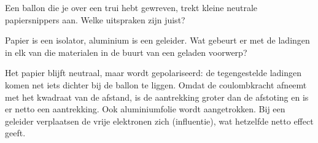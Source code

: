\documentclass{ximera}
\begin{document}
\begin{question}
    Een ballon die je over een trui hebt gewreven, trekt kleine neutrale papiersnippers aan. Welke uitspraken zijn juist?

    \begin{selectAll}
    \end{selectAll}

    \begin{hint}
        Papier is een isolator, aluminium is een geleider. Wat gebeurt er met de ladingen in elk van die materialen in de buurt van een geladen voorwerp?
    \end{hint}

    \begin{solution}\nl
        Het papier blijft neutraal, maar wordt gepolariseerd: de tegengestelde ladingen komen net iets dichter bij de ballon te liggen. Omdat de coulombkracht afneemt met het kwadraat van de afstand, is de aantrekking groter dan de afstoting en is er netto een aantrekking. Ook aluminiumfolie wordt aangetrokken. Bij een geleider verplaatsen de vrije elektronen zich (influentie), wat hetzelfde netto effect geeft.
    \end{solution}
\end{question}
\end{document}

